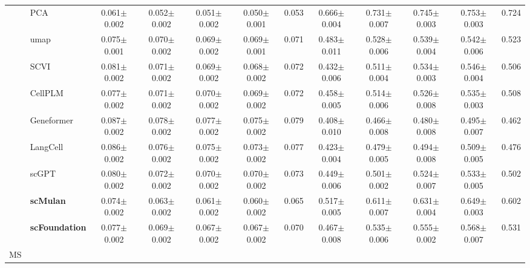 \begin{table}[htbp]
\begin{tabular}{cl|ccccc|ccccc}
    & PCA      & \cellcolor{gray!25}0.061$\pm$0.002 & \cellcolor{gray!25}0.052$\pm$0.002 & \cellcolor{gray!25}0.051$\pm$0.002 & \cellcolor{gray!25}0.050$\pm$0.001 & \cellcolor{gray!25}0.053      & \cellcolor{gray!25}0.666$\pm$0.004 & \cellcolor{gray!25}0.731$\pm$0.007 & \cellcolor{gray!25}0.745$\pm$0.003 & \cellcolor{gray!25}0.753$\pm$0.003 & \cellcolor{gray!25}0.724 \\
    & umap      & 0.075$\pm$0.001 & 0.070$\pm$0.002 & 0.069$\pm$0.002 & 0.069$\pm$0.001 & 0.071      & 0.483$\pm$0.011 & 0.528$\pm$0.006 & 0.539$\pm$0.004 & 0.542$\pm$0.006 & 0.523 \\
    & SCVI      & 0.081$\pm$0.002 & 0.071$\pm$0.002 & 0.069$\pm$0.002 & 0.068$\pm$0.002 & 0.072      & 0.432$\pm$0.006 & 0.511$\pm$0.004 & 0.534$\pm$0.003 & 0.546$\pm$0.004 & 0.506 \\
    & CellPLM      & 0.077$\pm$0.002 & 0.071$\pm$0.002 & 0.070$\pm$0.002 & 0.069$\pm$0.002 & 0.072      & 0.458$\pm$0.005 & 0.514$\pm$0.006 & 0.526$\pm$0.008 & 0.535$\pm$0.003 & 0.508 \\
    & Geneformer      & 0.087$\pm$0.002 & 0.078$\pm$0.002 & 0.077$\pm$0.002 & 0.075$\pm$0.002 & 0.079      & 0.408$\pm$0.010 & 0.466$\pm$0.008 & 0.480$\pm$0.008 & 0.495$\pm$0.007 & 0.462 \\
    & LangCell      & 0.086$\pm$0.002 & 0.076$\pm$0.002 & 0.075$\pm$0.002 & 0.073$\pm$0.002 & 0.077      & 0.423$\pm$0.004 & 0.479$\pm$0.005 & 0.494$\pm$0.008 & 0.509$\pm$0.005 & 0.476 \\
    & scGPT      & 0.080$\pm$0.002 & 0.072$\pm$0.002 & 0.070$\pm$0.002 & 0.070$\pm$0.002 & 0.073      & 0.449$\pm$0.006 & 0.501$\pm$0.002 & 0.524$\pm$0.007 & 0.533$\pm$0.005 & 0.502 \\
    & \cellcolor{gray!25}\textbf{scMulan}      & 0.074$\pm$0.002 & 0.063$\pm$0.002 & 0.061$\pm$0.002 & 0.060$\pm$0.002 & 0.065      & 0.517$\pm$0.005 & 0.611$\pm$0.007 & 0.631$\pm$0.004 & 0.649$\pm$0.003 & 0.602 \\
    & \cellcolor{gray!25}\textbf{scFoundation}      & 0.077$\pm$0.002 & 0.069$\pm$0.002 & 0.067$\pm$0.002 & 0.067$\pm$0.002 & 0.070      & 0.467$\pm$0.008 & 0.535$\pm$0.006 & 0.555$\pm$0.002 & 0.568$\pm$0.007 & 0.531 \\
    \midrule

    \multirow{9}{*}{MS}


\end{tabular}
\end{table}
